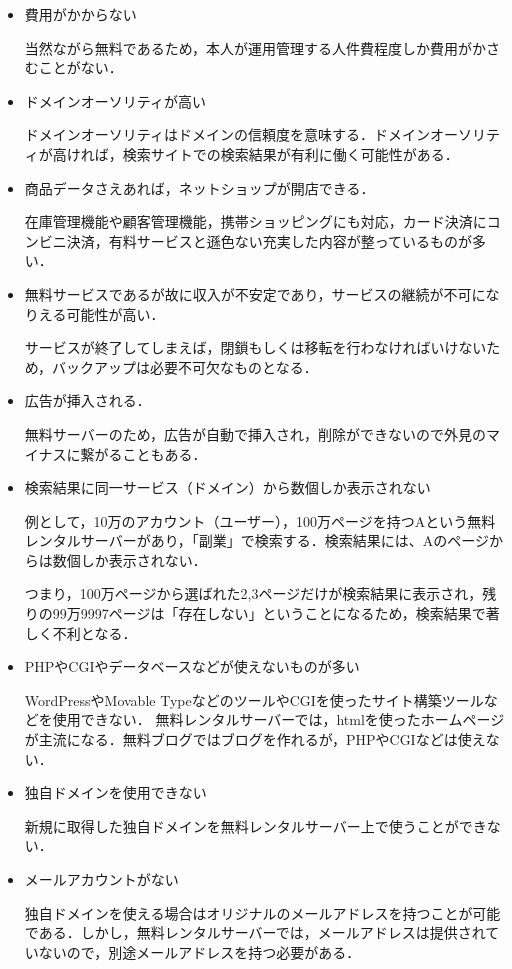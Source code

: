\begin{itemize}

 \item	費用がかからない

当然ながら無料であるため，本人が運用管理する人件費程度しか費用がかさむことがない．

 \item	ドメインオーソリティが高い

ドメインオーソリティはドメインの信頼度を意味する．ドメインオーソリティが高ければ，検索サイトでの検索結果が有利に働く可能性がある．

 \item	商品データさえあれば，ネットショップが開店できる．

在庫管理機能や顧客管理機能，携帯ショッピングにも対応，カード決済にコンビニ決済，有料サービスと遜色ない充実した内容が整っているものが多い．

 \item	無料サービスであるが故に収入が不安定であり，サービスの継続が不可になりえる可能性が高い．

サービスが終了してしまえば，閉鎖もしくは移転を行わなければいけないため，バックアップは必要不可欠なものとなる．

 \item	広告が挿入される．

無料サーバーのため，広告が自動で挿入され，削除ができないので外見のマイナスに繋がることもある．

 \item	検索結果に同一サービス（ドメイン）から数個しか表示されない

例として，10万のアカウント（ユーザー），100万ページを持つAという無料レンタルサーバーがあり，「副業」で検索する．検索結果には、Aのページからは数個しか表示されない．

つまり，100万ページから選ばれた2,3ページだけが検索結果に表示され，残りの99万9997ページは「存在しない」ということになるため，検索結果で著しく不利となる．

 \item	PHPやCGIやデータベースなどが使えないものが多い

WordPressやMovable TypeなどのツールやCGIを使ったサイト構築ツールなどを使用できない．
無料レンタルサーバーでは，htmlを使ったホームページが主流になる．無料ブログではブログを作れるが，PHPやCGIなどは使えない．

 \item	独自ドメインを使用できない

新規に取得した独自ドメインを無料レンタルサーバー上で使うことができない．

 \item	メールアカウントがない

独自ドメインを使える場合はオリジナルのメールアドレスを持つことが可能である．しかし，無料レンタルサーバーでは，メールアドレスは提供されていないので，別途メールアドレスを持つ必要がある．


\end{itemize}




